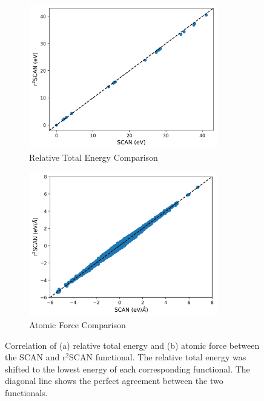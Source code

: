 \begin{figure}[tbhp]
	\centering
	\begin{subfigure}{0.48\textwidth}
		\centering

		\includegraphics[width=0.9\textwidth]{images/scan_vs_r2scan/energy_compare.png}
		\caption{Relative Total Energy Comparison}\label{fig:scan_r2scan_E}
	\end{subfigure}
	\hfill
	\begin{subfigure}{0.48\textwidth}
		\centering

		\includegraphics[width=0.9\textwidth]{images/scan_vs_r2scan/force_compare.png}
		\caption{Atomic Force Comparison}\label{fig:scan_r2scan_F}
	\end{subfigure}

	\caption{Correlation of  (a) relative total energy and (b) atomic force
		between 		the		SCAN and
		r$^2$SCAN functional. The relative total energy was shifted to
		the lowest energy of each corresponding functional. The
		diagonal line shows the
		perfect
		agreement between
		the two functionals.}\label{fig:scan_r2scan}
\end{figure}

